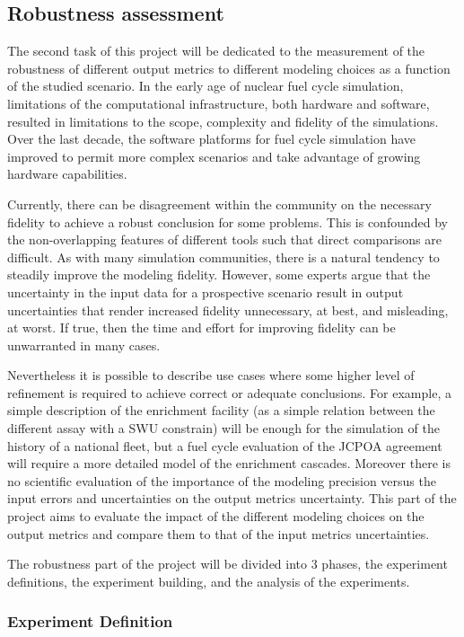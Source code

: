 
\subsection{Robustness assessment}

The second task of this project will be dedicated to the measurement of the
robustness of different output metrics to different modeling choices as a
function of the studied scenario.  In the early age of nuclear fuel cycle
simulation, limitations of the computational infrastructure, both hardware and
software, resulted in limitations to the scope, complexity and fidelity of the
simulations.  Over the last decade, the software platforms for fuel cycle
simulation have improved to permit more complex scenarios and take advantage
of growing hardware capabilities.

Currently, there can be disagreement within the community on the necessary
fidelity to achieve a robust conclusion for some problems.  This is confounded
by the non-overlapping features of different tools such that direct
comparisons are difficult. As with many simulation communities, there is a
natural tendency to steadily improve the modeling fidelity.  However, some
experts argue that the uncertainty in the input data for a prospective
scenario result in output uncertainties that render increased fidelity
unnecessary, at best, and misleading, at worst.  If true, then the time and
effort for improving fidelity can be unwarranted in many cases.

Nevertheless it is possible to describe use cases where some higher level of
refinement is required to achieve correct or adequate conclusions. For
example, a simple description of the enrichment facility (as a simple relation
between the different assay with a SWU constrain) will be enough for the
simulation of the history of a national fleet, but a fuel cycle evaluation of
the JCPOA agreement will require a more detailed model of the enrichment
cascades. Moreover there is no scientific evaluation of the importance of the
modeling precision versus the input errors and uncertainties on the output
metrics uncertainty. This part of the project aims to evaluate the impact of
the different modeling choices on the output metrics and compare them to that
of the input metrics uncertainties.

The robustness part of the project will be divided into 3 phases, the experiment
definitions, the experiment building, and the analysis of the experiments.

\subsubsection{Experiment Definition}

